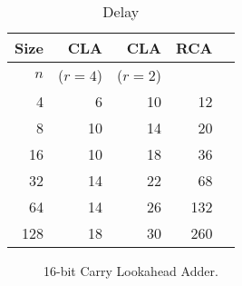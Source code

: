 \documentclass[times, twocolumn, 10pt]{article}
\begin{document}
\begin{enumerate}
\begin{enumerate}
\begin{table} [ht]
\begin{tabular}{|r|r|r|r|r|}
        Size & CLA     &  CLA    & RCA \\ \hline
        $n$  & ($r=4$) & ($r=2$) &     \\ \hline \hline
        4   &   6     &  10     &  12 \\ \hline 
        8   &   10    &  14     &  20 \\ \hline
        16   &   10    &  18     &  36 \\ \hline 
        32   &   14    &  22     &  68 \\ \hline 
        64   &   14    &  26     & 132 \\ \hline 
        128  &   18    &  30     & 260 \\ \hline   
      \end{tabular}
      \caption{Delay}
    \end{table}
  \end{enumerate}
  \begin{figure*}
    \label{cla16.fig}
    \begin{center}
      \setlength{\unitlength}{0.0105in}%
    \end{center}
    \caption{16-bit Carry Lookahead Adder.}
  \end{figure*}
\end{enumerate}
\end{document}
